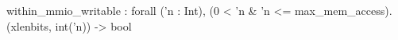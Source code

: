 within_mmio_writable : forall ('n : Int), (0 < 'n & 'n <= max_mem_access). (xlenbits, int('n)) -> bool